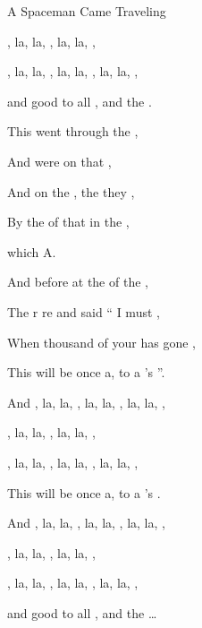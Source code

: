 \begin{SBSong}{A Spaceman Came Traveling }
\begin{SBChorus}
	, la, la, , la, la, ,  
	
	, la, la, , la, la, , la, la, ,
	
	 and good  to all , and   the .
  \end{SBChorus}
  \CBPageBrk
  \begin{SBVerse}
	This   went  through the ,
	
	And  were  on  that , 
	
	And  on the , the  they ,
	
	By the  of that  in the , 
	
	which   A.
  \end{SBVerse}
  \begin{SBVerse}
	And  before  at the  of the ,
	
	The r re and said `` I must , 
	
	When  thousand  of your  has gone ,
	
	This  will be once a, to a 's ''.
  \end{SBVerse}
  \begin{SBChorus}
	And   , la, la, , la, la, , la, la, ,
	
	, la, la, , la, la, ,  
	
	, la, la, , la, la, , la, la, ,
	
	This  will be once a, to a 's .
  \end{SBChorus}
  \begin{SBChorus}
	And   , la, la, , la, la, , la, la, , 
	
	, la, la, , la, la, ,  
	
	, la, la, , la, la, , la, la, ,
	
	 and good to all , and   the \ldots
  \end{SBChorus}
\end{SBSong}